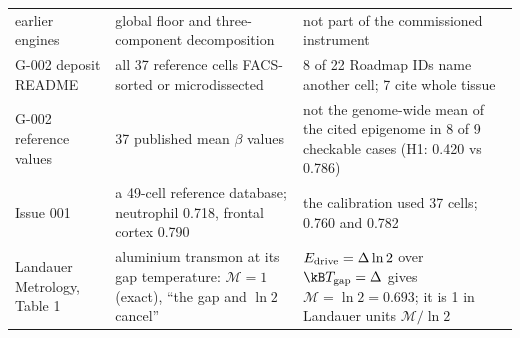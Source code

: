 \begin{center}
\begin{longtable}{@{}p{}p{}p{}@{}}
earlier engines & global floor and three-component decomposition & not part of the commissioned instrument \\
G-002 deposit README & all 37 reference cells FACS-sorted or microdissected & 8 of 22 Roadmap IDs name another cell; 7 cite whole tissue \\
G-002 reference values & 37 published mean $\beta$ values & not the genome-wide mean of the cited epigenome in 8 of 9 checkable cases (H1: 0.420 vs 0.786) \\
Issue 001 & a 49-cell reference database; neutrophil 0.718, frontal cortex 0.790 & the calibration used 37 cells; 0.760 and 0.782 \\
Landauer Metrology, Table 1 & aluminium transmon at its gap temperature: $\mathcal M=1$ (exact), ``the gap and $\ln2$ cancel'' & $E_{\rm drive}=\Delta\ln2$ over $\kB T_{\rm gap}=\Delta$ gives $\mathcal M=\ln2=0.693$; it is 1 in Landauer units $\mathcal M/\ln2$ \\
\bottomrule
\end{longtable}
\end{center}
